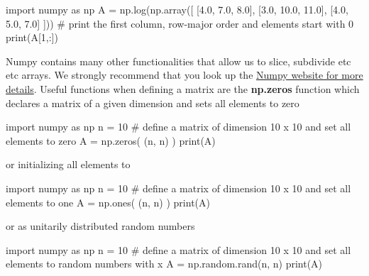 \documentclass[%
oneside,                 %
final,                   %
10pt]{article}
\begin{document}
\bpycod
import numpy as np
A = np.log(np.array([ [4.0, 7.0, 8.0], [3.0, 10.0, 11.0], [4.0, 5.0, 7.0] ]))
# print the first column, row-major order and elements start with 0
print(A[1,:]) 

\epycod

Numpy contains many other functionalities that allow us to slice, subdivide etc etc arrays. We strongly recommend that you look up the \href{{http://www.numpy.org/}}{Numpy website for more details}. Useful functions when defining a matrix are the \textbf{np.zeros} function which declares a matrix of a given dimension and sets all elements to zero






\bpycod
import numpy as np
n = 10
# define a matrix of dimension 10 x 10 and set all elements to zero
A = np.zeros( (n, n) )
print(A) 

\epycod

or initializing all elements to 






\bpycod
import numpy as np
n = 10
# define a matrix of dimension 10 x 10 and set all elements to one
A = np.ones( (n, n) )
print(A) 

\epycod

or as unitarily distributed random numbers






\bpycod
import numpy as np
n = 10
# define a matrix of dimension 10 x 10 and set all elements to random numbers with x \in [0, 1]
A = np.random.rand(n, n)
print(A) 

\epycod
\end{document}
